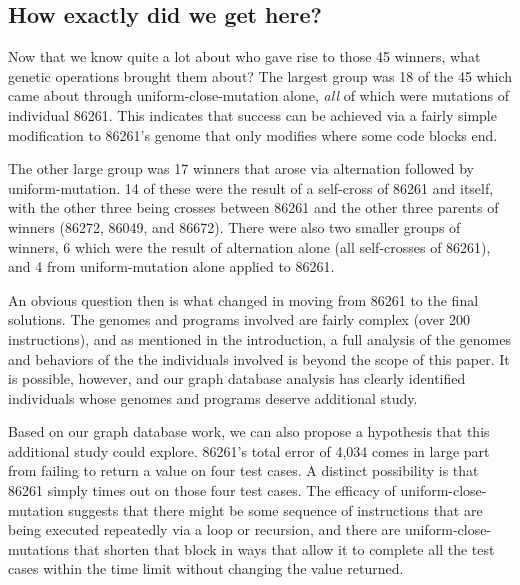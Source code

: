 

\subsection{How exactly did we get here?}
\label{sec:howDidWeGetHere}

Now that we know quite a lot about who gave rise to those 45 winners, what genetic operations
brought them about? The largest group was 18 of the 45 which came about through 
uniform-close-mutation alone, \emph{all} of which were mutations of individual 86261. This indicates
that success can be achieved via a fairly simple modification to 86261's genome that only modifies 
where some code blocks end.

The other large group was 17 winners that arose via alternation followed by uniform-mutation. 14 of
these were the result of a self-cross of 86261 and itself, with the other three being crosses between
86261 and the other three parents of winners (86272, 86049, and 86672). There were also two smaller
groups of winners, 6 which were the result of alternation alone (all self-crosses of 86261), and 4
from uniform-mutation alone applied to 86261.

An obvious question then is what changed in moving from 86261 to the final solutions. The genomes and
programs involved are fairly complex (over 200 instructions), and as mentioned in
the introduction, a full analysis of the genomes and behaviors of the the individuals involved is 
beyond the scope of this paper. It is possible, however, and our graph database analysis has clearly
identified individuals whose genomes and programs deserve additional study. 

Based on our graph database work, we can also propose a hypothesis that this additional study could
explore. 86261's total error of 4,034 comes in large part from failing to return a value on four 
test cases. A distinct possibility is that 86261 simply times out on those
four test cases. The efficacy of uniform-close-mutation suggests that there might be some sequence of 
instructions that are being executed repeatedly via a loop or recursion, and there are 
uniform-close-mutations that shorten that block in ways that allow it to complete all the test
cases within the time limit without changing the value returned.

